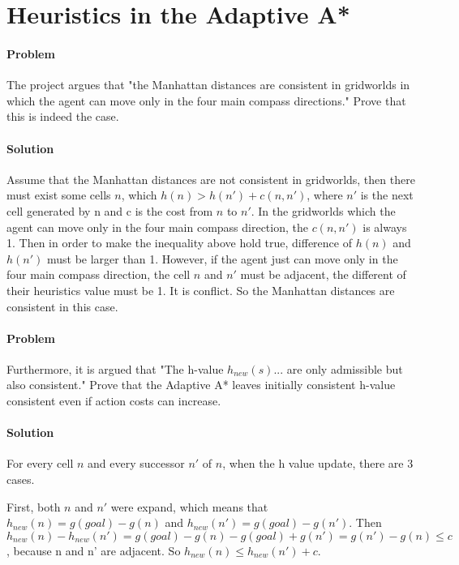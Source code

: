 \section{Heuristics in the Adaptive A*}

\paragraph{Problem}
The project argues that "the Manhattan distances are consistent in gridworlds
in which the agent can move only in the four main compass directions." Prove
that this is indeed the case.

\paragraph{Solution}
Assume that the Manhattan distances are not consistent in gridworlds, then
there must exist some cells $n$, which $h(n) > h(n') + c(n,n')$, where $n'$ is
the next cell generated by n and c is the cost from $n$ to $n'$. In the
gridworlds which the agent can move only in the four main compass direction,
the $c(n,n')$ is always 1. Then in order to make the inequality above hold
true, difference of $h(n)$ and $h(n')$ must be larger than 1. However, if the
agent just can move only in the four main compass direction, the cell $n$ and
$n'$ must be adjacent, the different of their heuristics value must be 1. It is
conflict. So the Manhattan distances are consistent in this case.

\paragraph{Problem}
Furthermore, it is argued that "The h-value $h_{new}(s)$... are only admissible
but also consistent." Prove that the Adaptive A* leaves initially consistent
h-value consistent even if action costs can increase.

\paragraph{Solution}
For every cell $n$ and every successor $n'$ of $n$, when the h value update,
there are 3 cases.

First, both $n$ and $n'$ were expand, which means that $h_{new}(n) = g(goal) -
g(n)$ and $h_{new}(n') = g(goal) - g(n')$. Then $h_{new}(n) - h_{new}(n') =
g(goal) - g(n) - g(goal) + g(n')=g(n') - g(n) \leq c$, because n and n' are
adjacent. So $h_{new}(n) \leq h_{new}(n') + c$. 

